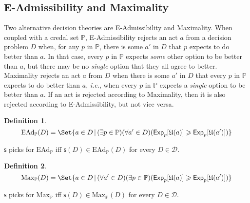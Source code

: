 \documentclass[a4paper]{article}
\newtheorem{definition}{Definition}
\newcommand\D{\mathcal{D}}
\newcommand\s{\mathsf{s}}
\renewcommand\P{\mathbb{P}} %
\newcommand\Exp{\mathsf{Exp}}
\newcommand\EAd{\mathrm{EAd}}
\newcommand\U{\mathfrak{U}} %
\newcommand\Maximality{\mathrm{Max}}
\newcommand{\IP}{\P}
\newcommand\SetDelimiter[1][]{
	\nonscript\,#1\vert \allowbreak \nonscript\,\mathopen{}}
\providecommand\given{\SetDelimiter}
\renewcommand{\geq}{\geqslant}
\newenvironment{CCM rewritten}
{\begingroup\color{blue}} %
{\endgroup}              %
\begin{document}
\subsection{E-Admissibility and Maximality}\label{sect:e-admiss}\label{sect:Max}


{ Two alternative decision theories are E-Admissibility and Maximality. When coupled with a credal set $\IP$, E-Admissibility rejects an act $a$ from a decision problem $D$ when, for any $p$ in $\IP$, there is some $a'$ in $D$ that $p$ expects to do better than $a$. In that case, every $p$ in $\IP$ expects \textit{some} other option to be better than $a$, but there may be no \textit{single} option that they all agree to better. Maximality rejects an act $a$ from $D$ when there is some $a'$ in $D$ that every $p$ in $\IP$ expects to do better than $a$, \textit{i.e.}, when every $p$ in $\IP$ expects a \textit{single} option to be better than $a$. If an act is rejected according to Maximality, then it is also rejected according to E-Admissibility, but not vice versa.}

\begin{definition}
 $$\EAd_\IP(D) = \Set{a \in D \given (\exists p \in \IP)(\forall a' \in D)(\Exp_p[\U(a)]\geq\Exp_p[\U(a')])}
	$$\end{definition}
	 $\s$ picks for $\EAd_\IP$ iff $\s(D)\in\EAd_\IP(D)$ for every $D\in\D$.
	

	
	\begin{definition}
	$$\Maximality_\IP(D) = \Set{a \in D \given (\forall a'\in D)(\exists p\in\IP)(\Exp_p[\U(a)] \geq\Exp_p[\U(a')])}$$
\end{definition}
	 $\s$ picks for $\Maximality_\IP$ iff $\s(D)\in\Maximality_\IP(D)$ for every $D\in\D$.
\end{document}
